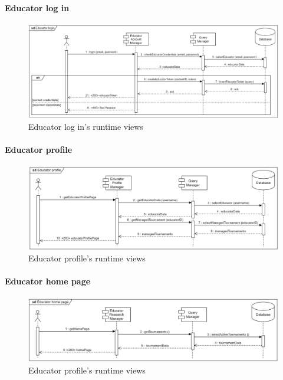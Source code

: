 \documentclass[12pt, a4paper]{report}
\begin{document}
    \paragraph*{Educator log in}
    \begin{figure}[H]
        \centering
        \includegraphics[width=1.0\linewidth]{images/elirv.png}
        \caption{Educator log in's runtime views}
    \end{figure}

    \paragraph*{Educator profile}
    \begin{figure}[H]
        \centering
        \includegraphics[width=1.0\linewidth]{images/eprv.png}
        \caption{Educator profile's runtime views}
    \end{figure}

    \paragraph*{Educator home page}
    \begin{figure}[H]
        \centering
        \includegraphics[width=1.0\linewidth]{images/ehprv.png}
        \caption{Educator profile's runtime views}
    \end{figure}
\end{document}
